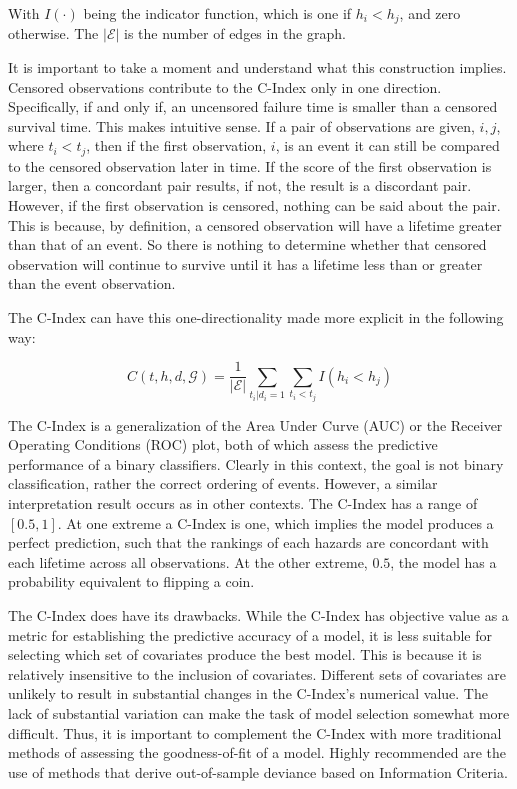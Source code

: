 With $I(\cdot)$ being the indicator function, which is one if $h_i < h_j$, and zero otherwise. The $\mathcal{|E|}$ is the number of edges in the graph.

It is important to take a moment and understand what this construction implies. Censored observations contribute to the C-Index only in one direction. Specifically, if and only if, an uncensored failure time is smaller than a censored survival time. This makes intuitive sense. If a pair of observations are given, $i,j$, where $t_i < t_j$, then if the first observation, $i$, is an event it can still be compared to the censored observation later in time. If the score of the first observation is larger, then a concordant pair results, if not, the result is a discordant pair. However, if the first observation is censored, nothing can be said about the pair. This is because, by definition, a censored observation will have a lifetime greater than that of an event. So there is nothing to determine whether that censored observation will continue to survive until it has a lifetime less than or greater than the event observation. 

The C-Index can have this one-directionality made more explicit in the following way\cite{Steck2008}:

$$ C(t, h, d, \mathcal{G}) = \frac{1}{\mathcal{|E|}} \sum_{t_{i}|d_i = 1} \sum_{t_i < t_j} I(h_i < h_j) $$

The C-Index is a generalization of the Area Under Curve (AUC) or the Receiver Operating Conditions (ROC) plot, both of which assess the predictive performance of a binary classifiers\cite{Cook2007}\cite{Tripepi2010}. Clearly in this context, the goal is not binary classification, rather the correct ordering of events. However, a similar interpretation result occurs as in other contexts. The C-Index has a range of $[0.5,1]$. At one extreme a C-Index is one, which implies the model produces a perfect prediction, such that the rankings of each hazards are concordant with each lifetime across all observations. At the other extreme, $0.5$, the model has a probability equivalent to flipping a coin. 


The C-Index does have its drawbacks. While the C-Index has objective value as a metric for establishing the predictive accuracy of a model, it is less suitable for selecting which set of covariates produce the best model. This is because it is relatively insensitive to the inclusion of covariates\cite{Cook2007}. Different sets of covariates are unlikely to result in substantial changes in the C-Index's numerical value. The lack of substantial variation can make the task of model selection somewhat more difficult. Thus, it is important to complement the C-Index with more traditional methods of assessing the goodness-of-fit of a model. Highly recommended are the use of methods that derive out-of-sample deviance based on Information Criteria. 

